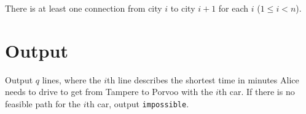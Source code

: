 There is at least one connection from city $i$ to city $i+1$ for each $i$ ($1 \le i < n$).

\section*{Output}
Output $q$ lines, where the $i$th line describes the shortest time in minutes Alice
needs to drive to get from Tampere to Porvoo with the $i$th car.
If there is no feasible path for the $i$th car, output \texttt{impossible}.
